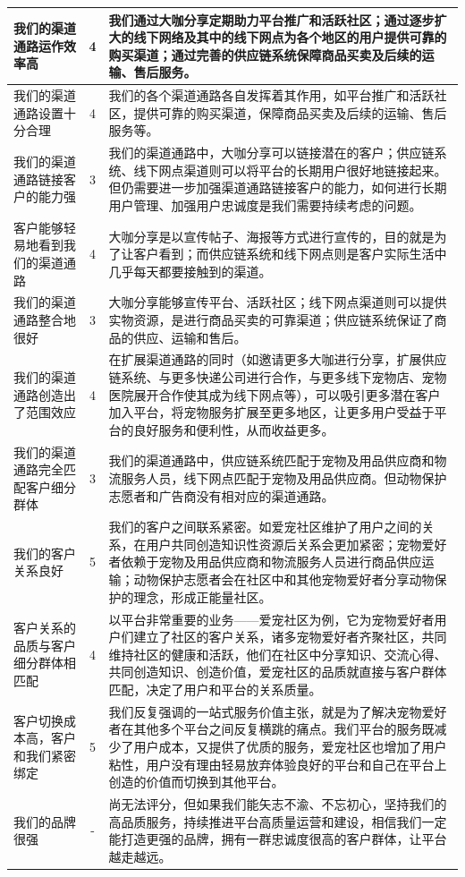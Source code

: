 \documentclass[a4paper]{ctexart}
\begin{document}
\begin{table}[h]
  \centering
\begin{tabular}{|p{3.5cm}|c|p{10cm}|}
  \hline
  我们的渠道通路运作效率高 & 4 & 我们通过大咖分享定期助力平台推广和活跃社区；通过逐步扩大的线下网络及其中的线下网点为各个地区的用户提供可靠的购买渠道；通过完善的供应链系统保障商品买卖及后续的运输、售后服务。\\
  \hline
  我们的渠道通路设置十分合理 & 4 & 我们的各个渠道通路各自发挥着其作用，如平台推广和活跃社区，提供可靠的购买渠道，保障商品买卖及后续的运输、售后服务等。\\
  \hline
  我们的渠道通路链接客户的能力强 & 3 & 我们的渠道通路中，大咖分享可以链接潜在的客户；供应链系统、线下网点渠道则可以将平台的长期用户很好地链接起来。但仍需要进一步加强渠道通路链接客户的能力，如何进行长期用户管理、加强用户忠诚度是我们需要持续考虑的问题。\\
  \hline
  客户能够轻易地看到我们的渠道通路 & 4 & 大咖分享是以宣传帖子、海报等方式进行宣传的，目的就是为了让客户看到；而供应链系统和线下网点则是客户实际生活中几乎每天都要接触到的渠道。\\
  \hline
  我们的渠道通路整合地很好 & 3 & 大咖分享能够宣传平台、活跃社区；线下网点渠道则可以提供实物资源，是进行商品买卖的可靠渠道；供应链系统保证了商品的供应、运输和售后。\\
  \hline
  我们的渠道通路创造出了范围效应 & 4 & 在扩展渠道通路的同时（如邀请更多大咖进行分享，扩展供应链系统、与更多快递公司进行合作，与更多线下宠物店、宠物医院展开合作使其成为线下网点等），可以吸引更多潜在客户加入平台，将宠物服务扩展至更多地区，让更多用户受益于平台的良好服务和便利性，从而收益更多。\\
  \hline
  我们的渠道通路完全匹配客户细分群体 & 3 & 我们的渠道通路中，供应链系统匹配于宠物及用品供应商和物流服务人员，线下网点匹配于宠物及用品供应商。但动物保护志愿者和广告商没有相对应的渠道通路。\\
  \hline
  我们的客户关系良好 & 5 & 我们的客户之间联系紧密。如爱宠社区维护了用户之间的关系，在用户共同创造知识性资源后关系会更加紧密；宠物爱好者依赖于宠物及用品供应商和物流服务人员进行商品供应运输；动物保护志愿者会在社区中和其他宠物爱好者分享动物保护的理念，形成正能量社区。\\
  \hline
  客户关系的品质与客户细分群体相匹配 & 4 & 	以平台非常重要的业务——爱宠社区为例，它为宠物爱好者用户们建立了社区的客户关系，诸多宠物爱好者齐聚社区，共同维持社区的健康和活跃，他们在社区中分享知识、交流心得、共同创造知识、创造价值，爱宠社区的品质就直接与客户群体匹配，决定了用户和平台的关系质量。\\
  \hline
  客户切换成本高，客户和我们紧密绑定 & 5 & 我们反复强调的一站式服务价值主张，就是为了解决宠物爱好者在其他多个平台之间反复横跳的痛点。我们平台的服务既减少了用户成本，又提供了优质的服务，爱宠社区也增加了用户粘性，用户没有理由轻易放弃体验良好的平台和自己在平台上创造的价值而切换到其他平台。\\
  \hline
  我们的品牌很强 & - & 尚无法评分，但如果我们能矢志不渝、不忘初心，坚持我们的高品质服务，持续推进平台高质量运营和建设，相信我们一定能打造更强的品牌，拥有一群忠诚度很高的客户群体，让平台越走越远。\\
  \hline
\end{tabular}
\end{table}
\end{document}
